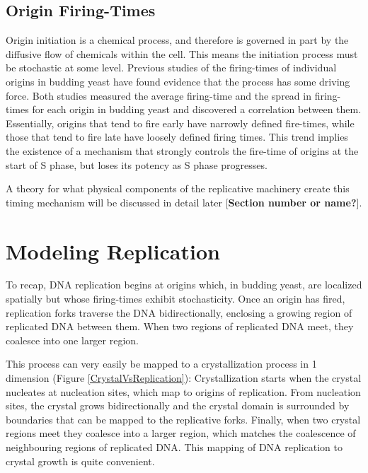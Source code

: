 		\subsection{Origin Firing-Times}
		
		Origin initiation is a chemical process, and therefore is governed in part by the diffusive flow of chemicals within the cell.
		This means the initiation process must be stochastic at some level.
		Previous studies of the firing-times of individual origins in budding yeast have found evidence that the process has some driving force\cite{ScottsPaper,StochasticTermination}.
		Both studies measured the average firing-time and the spread in firing-times for each origin in budding yeast and discovered a correlation between them.
		Essentially, origins that tend to fire early have narrowly defined fire-times, while those that tend to fire late have loosely defined firing times.
		This trend implies the existence of a mechanism that strongly controls the fire-time of origins at the start of S phase, but loses its potency as S phase progresses.
		
		A theory for what physical components of the replicative machinery create this timing mechanism will be discussed in detail later [\textbf{Section number or name?}].
		
		
	\section{Modeling Replication}
	
	To recap, DNA replication begins at origins which, in budding yeast, are localized spatially but whose firing-times exhibit stochasticity.
	Once an origin has fired, replication forks traverse the DNA bidirectionally, enclosing a growing region of replicated DNA between them.
	When two regions of replicated DNA meet, they coalesce into one larger region.
	
	This process can very easily be mapped to a crystallization process in 1 dimension (Figure \ref{CrystalVsReplication}):
	Crystallization starts when the crystal nucleates at nucleation sites, which map to origins of replication.
	From nucleation sites, the crystal grows bidirectionally and the crystal domain is surrounded by boundaries that can be mapped to the replicative forks.
	Finally, when two crystal regions meet they coalesce into a larger region, which matches the coalescence of neighbouring regions of replicated DNA.
	This mapping of DNA replication to crystal growth is quite convenient.
	
